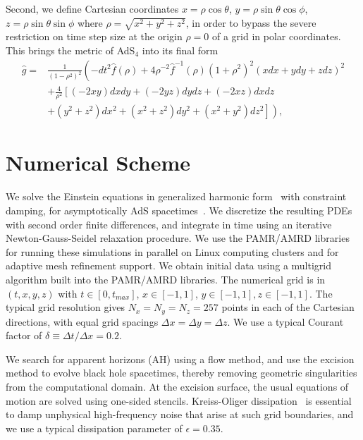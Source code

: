 \documentclass[12pt]{iopart}
\begin{document}
Second, we define Cartesian coordinates $x=\rho\cos\theta$, $y=\rho\sin\theta\cos\phi$, $z=\rho\sin\theta\sin\phi$ where $\rho=\sqrt{x^2+y^2+z^2}$, in order to bypass the severe restriction on time step size at the origin $\rho=0$ of a grid in polar coordinates. 
This brings the metric of AdS$_4$ into its final form
\begin{eqnarray}\label{eqn:ads4_final}
\hat{g}=&\frac{1}{\left(1-\rho^2\right)^2 }\left( -dt^2 \hat{f}(\rho) +4\rho^{-2}\hat{f}^{-1}(\rho) \left(1+\rho^2\right)^2 (x dx + y dy + z dz)^2 \right. \nonumber \\
&+\frac{4}{\rho^2} \left[\left(-2 x y\right) dx dy + \left(- 2 y z\right) dy dz + \left(- 2 x z\right) dx dz \right. \nonumber \\
&\left. \left. + \left(y^2+z^2\right) dx^2 + \left(x^2+z^2\right) dy^2 + \left(x^2+y^2\right) dz^2 \right] \right),
\end{eqnarray}



\section{Numerical Scheme}\label{sec:numerical_scheme}

We solve the Einstein equations in generalized harmonic form~\cite{Pretorius:2004jg} with constraint damping, for asymptotically AdS spacetimes~\cite{Bantilan:2012vu}.
We discretize the resulting PDEs with second order finite differences, and integrate in time using an iterative Newton-Gauss-Seidel relaxation procedure. 
We use the PAMR/AMRD libraries \cite{PAMR} for running these simulations in parallel on Linux computing clusters and for adaptive mesh refinement support.
We obtain initial data using a multigrid algorithm built into the PAMR/AMRD libraries.
The numerical grid is in $(t,x,y,z)$ with $t \in [0,t_{max}]$, $x \in [-1,1]$, $y \in [-1,1], z \in [-1,1]$.
The typical grid resolution gives $N_x=N_y=N_z=257$ points in each of the Cartesian directions, with equal grid spacings $\Delta x = \Delta y = \Delta z$.
We use a typical Courant factor of $\delta \equiv \Delta t / \Delta x = 0.2$.

We search for apparent horizons (AH) using a flow method, and use the excision method to evolve black hole spacetimes, thereby removing geometric singularities from the computational domain.
At the excision surface, the usual equations of motion are solved using one-sided stencils. 
Kreiss-Oliger dissipation~\cite{kreiss1973methods} is essential to damp unphysical high-frequency noise that arise at such grid boundaries, and we use a typical dissipation parameter of $\epsilon=0.35$.
\end{document}
